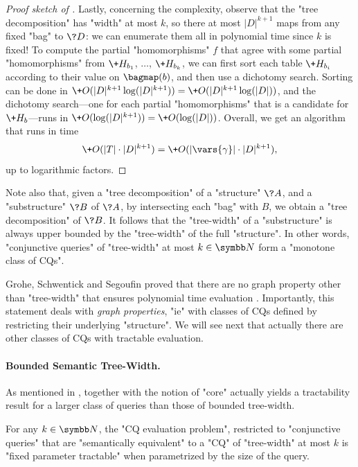 \begin{proof}[Proof sketch of {}]
	Lastly, concerning the complexity, observe that the "tree decomposition"
	has "width" at most $k$, so there at most
	$|D|^{k+1}$ maps from any fixed "bag" to $\?D$: we can enumerate them all
	in polynomial time since $k$ is fixed! 
	To compute the partial "homomorphisms" $f$ that agree with
	some partial "homomorphisms" from $\+H_{b_1}$, $\dotsc$, $\+H_{b_k}$,
	we can first sort each table $\+H_{b_i}$ according to their value on $\bagmap(b)$,
	and then use a dichotomy search. Sorting can be done
	in $\+O(|D|^{k+1}\log(|D|^{k+1})) = \+O(|D|^{k+1}\log(|D|))$,
	and the dichotomy search---one for each partial "homomorphisms" that is a candidate
	for $\+H_b$---runs in $\+O(\log(|D|^{k+1})) = \+O(\log(|D|))$.
	Overall, we get an algorithm that runs in time
	\[
		\+O(|T|\cdot |D|^{k+1}) = \+O(|\vars{\gamma}|\cdot |D|^{k+1}),
	\]
	up to logarithmic factors.
\end{proof}

Note also that, given a "tree decomposition" of a "structure" $\?A$,
and a "substructure" $\?B$ of $\?A$, by intersecting each "bag" with $B$,
we obtain a "tree decomposition" of $\?B$. It follows that the "tree-width"
of a "substructure" is always upper bounded by the "tree-width" of the full "structure".
In other words, "conjunctive queries" of "tree-width" at most $k\in\N$
form a "monotone class of CQs".

Grohe, Schwentick and Segoufin proved that there
are no graph property other than "tree-width" that ensures
polynomial time evaluation 
\cite[Corollary~19]{GroheSchwentickSegoufin2001Evaluation}.%
Importantly, this statement deals with \emph{graph properties},
"ie" with classes of CQs defined by restricting their underlying "structure".
We will see next that actually there are other classes of CQs
with tractable evaluation.

\paragraph*{Bounded Semantic Tree-Width.}
As mentioned in , 
together with the notion of "core" actually yields a tractability result
for a larger class of queries than those of bounded tree-width.

\begin{proposition}
	For any $k\in\N$, the "CQ evaluation problem",
	restricted to "conjunctive queries" that are "semantically equivalent" 
	to a "CQ" of "tree-width" at most $k$ is "fixed parameter tractable"
	when parametrized by the size of the query.
\end{proposition}

